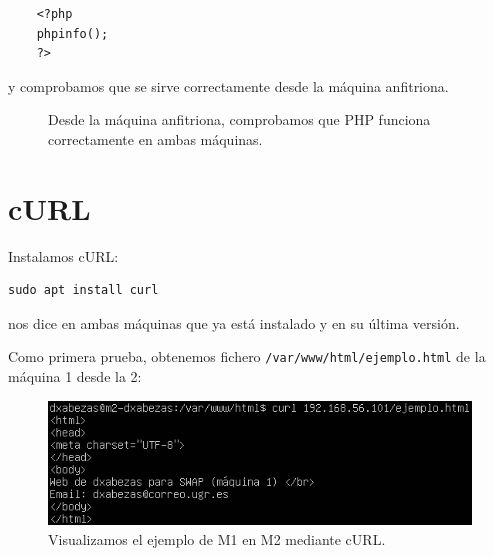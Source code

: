 \documentclass{article}
\begin{document}
\begin{verbatim}
	<?php
	phpinfo();
	?>
\end{verbatim}

y comprobamos que se sirve correctamente desde la máquina anfitriona.

\begin{figure}[H]
	\centering
	\caption{Desde la máquina anfitriona, comprobamos que PHP funciona correctamente en ambas máquinas.}
	\label{fig:php-info}
\end{figure}

\section{cURL}

Instalamos cURL:

\begin{verbatim}
sudo apt install curl
\end{verbatim}
nos dice en ambas máquinas que ya está instalado y en su última versión.

Como primera prueba, obtenemos fichero \texttt{/var/www/html/ejemplo.html} de la máquina 1 desde la 2:

\begin{figure}[H]
	\centering
	\includegraphics[width=120mm]{imgs/curl}
	\caption{Visualizamos el ejemplo de M1 en M2 mediante cURL.}
	\label{fig:curl}
\end{figure}
\end{document}
